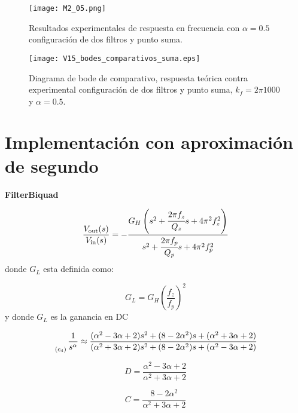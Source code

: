	\begin{figure}[!ht] 
		\caption{Resultados experimentales de respuesta en frecuencia con $\alpha = 0.5$ configuración de dos filtros y punto suma.}
		\label{fig:M2_05}
		\centering
		\texttt{[image: M2\_05.png]}
	\end{figure}	
	
	\begin{figure}[!ht]
		\caption{Diagrama de bode de comparativo, respuesta teórica contra experimental configuración de dos filtros y punto suma,  $k_{f} = 2\pi 1000$ y  $\alpha = 0.5$.} 
		\label{fig:V15_bodes_comparativos_suma}
		\centering
		\texttt{[image: V15\_bodes\_comparativos\_suma.eps]}
	\end{figure}	

\newpage
	\section{Implementación con aproximación de segundo}
	
	\textbf{FilterBiquad}
	
	\begin{equation}
		\frac{V_{\mathrm{out}} (s)}{V_{\mathrm{in}}(s)} = - \frac{G_{H} \left(  s^{2} + \cfrac{2 \pi f_{z}}{Q_{z}} s + 4 \pi^{2} f_{z}^{2} \right)}{s^{2} + \cfrac{2 \pi f_{p}}{Q_{p}}s + 4\pi^{2} f_{p}^{2} }
	\end{equation}
	donde $G_{L}$  esta definida como:
	
	\begin{equation}
		G_{L} = G_{H} \left( \frac{f_{z}}{f_{p}} \right)^{2}
	\end{equation}
	y donde $G_{L}$ es la ganancia en DC
	
		\begin{equation}
		\genfrac{}{}{0pt}{0}{}{_{(c_{4})}} \frac{1}{s^{\alpha}} \approx \frac{(\alpha^{2} - 3\alpha + 2) s^{2} + (8 - 2 \alpha^{2})s + (\alpha^{2} + 3\alpha + 2) }{(\alpha^{2} + 3\alpha + 2) s^{2} + (8 - 2 \alpha^{2})s + (\alpha^{2} - 3\alpha + 2)}
		\end{equation}
		
		\begin{equation}
			D = \frac{\alpha^{2} - 3 \alpha + 2}{\alpha^{2} + 3\alpha + 2}
		\end{equation}
		
		\begin{equation}
			C = \frac{8 - 2 \alpha^{2}}{\alpha^{2} +  3 \alpha + 2}
		\end{equation}
		

